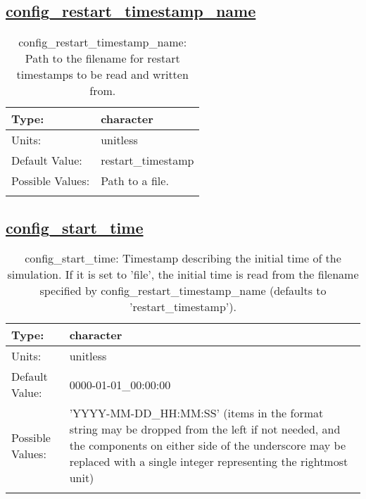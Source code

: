 \subsection[config\_restart\_timestamp\_name]{\hyperref[sec:nm_tab_time_management]{config\_restart\_timestamp\_name}}
\label{subsec:nm_sec_config_restart_timestamp_name}
\begin{center}
\begin{longtable}{| p{2.0in} || p{4.0in} |}
    \hline
    Type: & character \\
    \hline
    Units: & \si{unitless} \\
    \hline
    Default Value: & restart\_timestamp \\
    \hline
    Possible Values: & Path to a file. \\
    \hline
    \caption{config\_restart\_timestamp\_name: Path to the filename for restart timestamps to be read and written from.}
\end{longtable}
\end{center}
\subsection[config\_start\_time]{\hyperref[sec:nm_tab_time_management]{config\_start\_time}}
\label{subsec:nm_sec_config_start_time}
\begin{center}
\begin{longtable}{| p{2.0in} || p{4.0in} |}
    \hline
    Type: & character \\
    \hline
    Units: & \si{unitless} \\
    \hline
    Default Value: & 0000-01-01\_00:00:00 \\
    \hline
    Possible Values: & 'YYYY-MM-DD\_HH:MM:SS' (items in the format string may be dropped from the left if not needed, and the components on either side of the underscore may be replaced with a single integer representing the rightmost unit) \\
    \hline
    \caption{config\_start\_time: Timestamp describing the initial time of the simulation.  If it is set to 'file', the initial time is read from the filename specified by config\_restart\_timestamp\_name (defaults to 'restart\_timestamp').}
\end{longtable}
\end{center}

